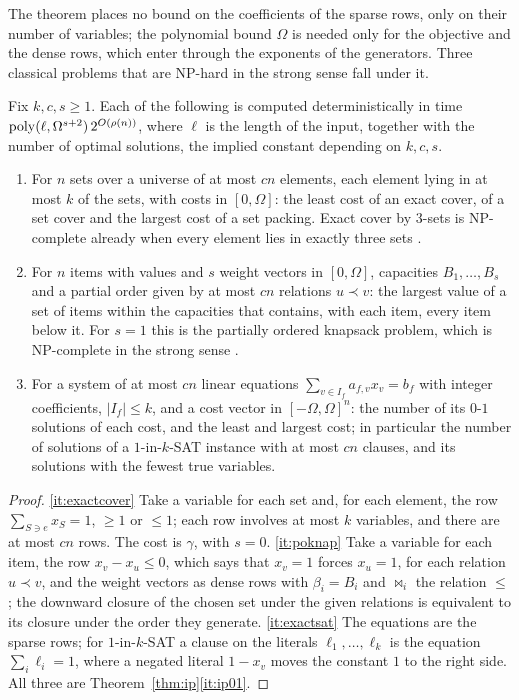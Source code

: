 The theorem places no bound on the coefficients of the sparse rows, only on
their number of variables; the polynomial bound $\Omega$ is needed only for the
objective and the dense rows, which enter through the exponents of the
generators. Three classical problems that are NP-hard in the strong sense fall
under it.

\begin{corollary}\label{cor:ip}
Fix $k,c,s\ge1$. Each of the following is computed deterministically in time
$\operatorname{poly}(\ell,\Omega^{s+2})\,2^{O(\rho(n))}$, where $\ell$ is the length of the
input, together with the number of optimal solutions, the implied constant
depending on $k,c,s$.
\begin{enumerate}[label=\textup{(\alph*)},leftmargin=2.2em]
\item\label{it:exactcover} For $n$ sets over a universe of at most $cn$
elements, each element lying in at most $k$ of the sets, with costs in
$[0,\Omega]$: the least cost of an exact cover, of a set cover and the largest
cost of a set packing. Exact cover by $3$-sets is NP-complete already when
every element lies in exactly three sets \cite{Gon85}.
\item\label{it:poknap} For $n$ items with values and $s$ weight vectors in
$[0,\Omega]$, capacities $B_1,\dots,B_s$ and a partial order given by at most
$cn$ relations $u\prec v$: the largest value of a set of items within the
capacities that contains, with each item, every item below it. For $s=1$ this
is the partially ordered knapsack problem, which is NP-complete in the strong
sense \cite{JN83}.
\item\label{it:exactsat} For a system of at most $cn$ linear equations
$\sum_{v\in I_f}a_{f,v}x_v=b_f$ with integer coefficients, $|I_f|\le k$, and a
cost vector in $[-\Omega,\Omega]^n$: the number of its $0$-$1$ solutions of
each cost, and the least and largest cost; in particular the number of
solutions of a $1$-in-$k$-SAT instance with at most $cn$ clauses, and its
solutions with the fewest true variables.
\end{enumerate}
\end{corollary}

\begin{proof}
\ref{it:exactcover} Take a variable for each set and, for each element, the
row $\sum_{S\ni e}x_S=1$, $\ge1$ or $\le1$; each row involves at most $k$
variables, and there are at most $cn$ rows. The cost is $\gamma$, with $s=0$.
\ref{it:poknap} Take a variable for each item, the row $x_v-x_u\le0$, which
says that $x_v=1$ forces $x_u=1$, for each relation $u\prec v$, and the weight
vectors as dense rows with $\beta_i=B_i$ and $\bowtie_i$ the relation $\le$;
the downward closure of the chosen set under the given relations is
equivalent to its closure under the order they generate. \ref{it:exactsat}
The equations are the sparse rows; for $1$-in-$k$-SAT a clause on the
literals $\ell_1,\dots,\ell_k$ is the equation $\sum_i\ell_i=1$, where a
negated literal $1-x_v$ moves the constant $1$ to the right side. All three
are Theorem~\ref{thm:ip}\ref{it:ip01}.
\end{proof}

